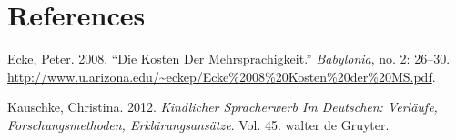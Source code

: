 \documentclass[
  letterpaper,
]{scrbook}
\newlength{\cslhangindent}
\newlength{\cslentryspacingunit} %
\newenvironment{CSLReferences}[2] %
 {%
  \setlength{\parindent}{0pt}
  \ifodd #1
  \let\oldpar\par
  \def\par{\hangindent=\cslhangindent\oldpar}
  \fi
  \setlength{\parskip}{#2\cslentryspacingunit}
 }%
 {}
\begin{document}

\hypertarget{references}{%
\chapter*{References}\label{references}}


\hypertarget{refs}{}
\begin{CSLReferences}{1}{0}
\leavevmode{}%
Ecke, Peter. 2008. {``Die Kosten Der Mehrsprachigkeit.''}
\emph{Babylonia}, no. 2: 26--30.
\url{http://www.u.arizona.edu/~eckep/Ecke\%2008\%20Kosten\%20der\%20MS.pdf}.

\leavevmode{}%
Kauschke, Christina. 2012. \emph{Kindlicher Spracherwerb Im Deutschen:
Verl{ä}ufe, Forschungsmethoden, Erkl{ä}rungsans{ä}tze}. Vol. 45. walter
de Gruyter.

\end{CSLReferences}


\backmatter

\printindex
\end{document}

